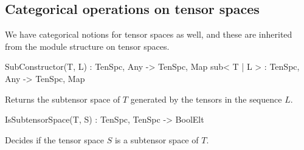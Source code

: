 \subsection{Categorical operations on tensor spaces}

We have categorical notions for tensor spaces as well, and these are inherited from the module structure on tensor spaces.

\begin{intrinsics}
SubConstructor(T, L) : TenSpc, Any -> TenSpc, Map
sub< T | L > : TenSpc, Any -> TenSpc, Map
\end{intrinsics}

Returns the subtensor space of $T$ generated by the tensors in the sequence $L$.





\begin{intrinsics}
IsSubtensorSpace(T, S) : TenSpc, TenSpc -> BoolElt
\end{intrinsics}

Decides if the tensor space $S$ is a subtensor space of $T$.

